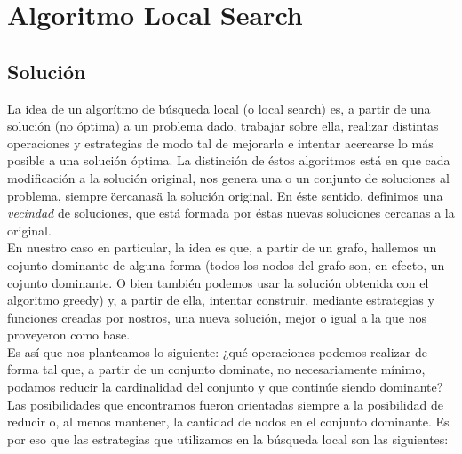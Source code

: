 \section{Algoritmo Local Search}

\subsection{Solución}
La idea de un algorítmo de búsqueda local (o local search) es, a partir de una solución (no óptima) a un problema dado, trabajar sobre ella, realizar distintas operaciones y estrategias de modo tal de mejorarla e intentar acercarse lo más posible a una solución óptima. La distinción de éstos algoritmos está en que cada modificación a la solución original, nos genera una o un conjunto de soluciones al problema, siempre \"cercanas\" a la solución original. En éste sentido, definimos una \textit{vecindad} de soluciones, que está formada por éstas nuevas soluciones cercanas a la original. \\
En nuestro caso en particular, la idea es que, a partir de un grafo, hallemos un cojunto dominante de alguna forma (todos los nodos del grafo son, en efecto, un cojunto dominante. O bien también podemos usar la solución obtenida con el algoritmo greedy) y, a partir de ella, intentar construir, mediante estrategias y funciones creadas por nostros, una nueva solución, mejor o igual a la que nos proveyeron como base. \\
Es así que nos planteamos lo siguiente: ¿qué operaciones podemos realizar de forma tal que, a partir de un conjunto dominate, no necesariamente mínimo, podamos reducir la cardinalidad del conjunto y que continúe siendo dominante? Las posibilidades que encontramos fueron orientadas siempre a la posibilidad de reducir o, al menos mantener, la cantidad de nodos en el conjunto dominante. Es por eso que las estrategias que utilizamos en la búsqueda local son las siguientes: 

